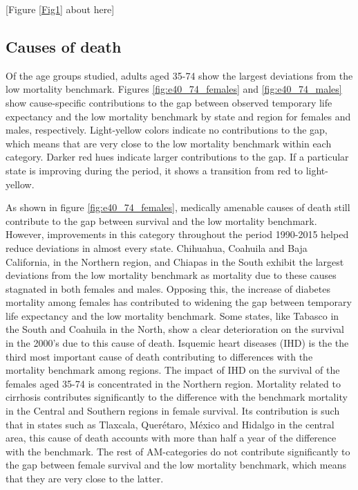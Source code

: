\documentclass{bmcart}
\begin{document}
\begin{center}
[Figure \ref{Fig1} about here]
\end{center}




\subsection*{Causes of death}

Of the age groups studied, adults aged 35-74 show the largest deviations from the low mortality benchmark. Figures  \ref{fig:e40_74_females} and \ref{fig:e40_74_males} show cause-specific contributions to the gap between observed temporary life expectancy and the low mortality benchmark by state and region for females and males, respectively. Light-yellow colors indicate no contributions to the gap, which means that are very close to the low mortality benchmark within each category. Darker red hues indicate larger contributions to the gap. If a particular state is improving during the period, it shows a transition from red to light-yellow. 

As shown in figure \ref{fig:e40_74_females}, medically amenable causes of death still contribute to the gap between survival and the low mortality benchmark. However, improvements in this category throughout the period 1990-2015 helped reduce deviations in almost every state. Chihuahua, Coahuila and Baja California, in the Northern region, and Chiapas in the South exhibit the largest deviations from the low mortality benchmark as mortality due to these causes stagnated in both females and males. Opposing this, the increase of diabetes mortality among females has contributed to widening the gap between temporary life expectancy and the low mortality benchmark. Some states, like Tabasco in the South and Coahuila in the North, show a clear deterioration on the survival in the 2000's due to this cause of death. Isquemic heart diseases (IHD) is the the third most important cause of death contributing to differences with the mortality benchmark among regions. The impact of IHD on the survival of the females aged 35-74 is concentrated in the Northern region. Mortality related to cirrhosis contributes significantly to the difference with the benchmark mortality in the Central and Southern regions in female survival. Its contribution is such that in states such as Tlaxcala, Quer\'etaro, M\'exico and Hidalgo in the central area, this cause of death accounts with more than half a year of the difference with the benchmark. The rest of AM-categories do not contribute significantly to the gap between female survival and the low mortality benchmark, which means that they are very close to the latter.\\
\end{document}
